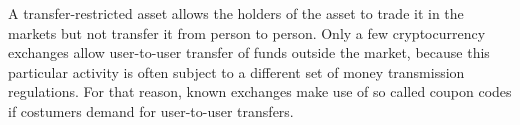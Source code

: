 A transfer-restricted asset allows the holders of the asset to trade it in the
markets but not transfer it from person to person. Only a few cryptocurrency
exchanges allow user-to-user transfer of funds outside the market, because this
particular activity is often subject to a different set of money transmission
regulations. For that reason, known exchanges make use of so called coupon
codes if costumers demand for user-to-user transfers.
